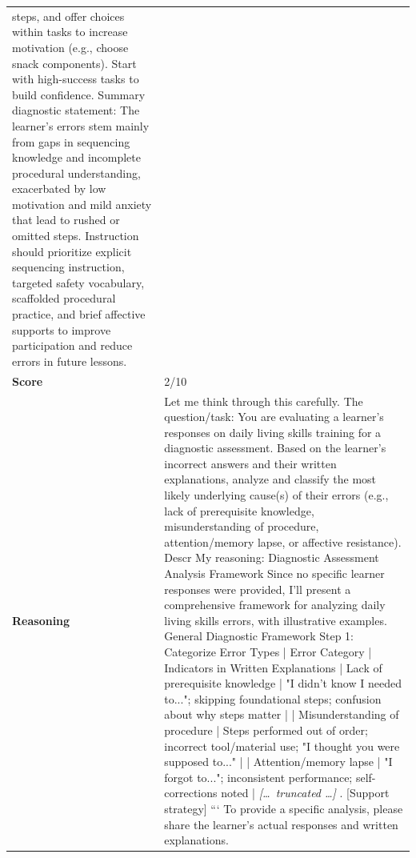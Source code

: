 \begin{longtable}{@{}l p{13cm}@{}}
steps, and offer choices within tasks to increase motivation (e.g., choose snack components). Start with high-success tasks to build confidence. \newline Summary diagnostic statement: The learner's errors stem mainly from gaps in sequencing knowledge and incomplete procedural understanding, exacerbated by low motivation and mild anxiety that lead to rushed or omitted steps. Instruction should prioritize explicit sequencing instruction, targeted safety vocabulary, scaffolded procedural practice, and brief affective supports to improve participation and reduce errors in future lessons.      \\
  \textbf{Score}     & 2/10  \\
  \textbf{Reasoning} & Let me think through this carefully. \newline The question/task: You are evaluating a learner's responses on daily living skills training for a diagnostic assessment. Based on the learner's incorrect answers and their written explanations, analyze and classify the most likely underlying cause(s) of their errors (e.g., lack of prerequisite knowledge, misunderstanding of procedure, attention/memory lapse, or affective resistance). Descr \newline My reasoning: Diagnostic Assessment Analysis Framework \newline Since no specific learner responses were provided, I'll present a comprehensive framework for analyzing daily living skills errors, with illustrative examples. General Diagnostic Framework \newline Step 1: Categorize Error Types \newline | Error Category | Indicators in Written Explanations | \newline Lack of prerequisite knowledge | "I didn't know I needed to..."; skipping foundational steps; confusion about why steps matter | \newline | Misunderstanding of procedure | Steps performed out of order; incorrect tool/material use; "I thought you were supposed to..." | \newline | Attention/memory lapse | "I forgot to..."; inconsistent performance; self-corrections noted | \newline \textit{[\ldots\ truncated \ldots]} \newline 3. [Support strategy] \newline ``` \newline To provide a specific analysis, please share the learner's actual responses and written explanations.  \\

\end{longtable}
